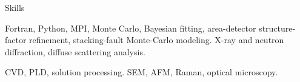 
\begin{rubric}{Skills}

    Fortran, Python, MPI, Monte Carlo, Bayesian fitting, area-detector structure-factor refinement, stacking-fault Monte-Carlo modeling.
    X-ray and neutron diffraction, diffuse scattering analysis.

    CVD, PLD, solution processing.
    SEM, AFM, Raman, optical microscopy.

\end{rubric}
